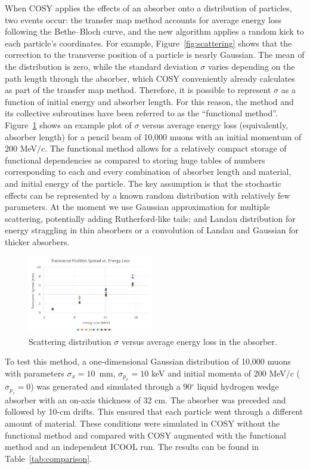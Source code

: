 \documentclass{jacow}
\begin{document}
When COSY applies the effects of an absorber onto a distribution of particles, two events occur: the transfer map method accounts for average energy loss following the Bethe--Bloch curve, and the new algorithm applies a random kick to each particle's coordinates. For example, Figure~\ref{fig:scattering} shows that the correction to the transverse position of a particle is nearly Gaussian. The mean of the distribution is zero, while the standard deviation $\sigma$ varies depending on the path length through the absorber, which COSY conveniently already calculates as part of the transfer map method. Therefore, it is possible to represent $\sigma$ as a function of initial energy and absorber length. For this reason, the method and its collective subroutines have been referred to as the ``functional method''. Figure~\ref{fig:functional} shows an example plot of $\sigma$ versus average energy loss (equivalently, absorber length) for a pencil beam of 10,000 muons with an initial momentum of 200 MeV$/c$. The functional method allows for a relatively compact storage of functional dependencies as compared to storing huge tables of numbers corresponding to each and every combination of absorber length and material, and initial energy of the particle. The key assumption is that the stochastic effects can be represented by a known random distribution with relatively few parameters. At the moment we use Gaussian approximation for multiple scattering, potentially adding Rutherford-like tails; and Landau distribution for energy straggling in thin absorbers or a convolution of Landau and Gaussian for thicker absorbers.

\begin{figure}[htf]
\centering
\includegraphics[width=0.49\textwidth]{figures/functional.jpg}
\caption{Scattering distribution $\sigma$ versus average energy loss in the absorber.}
\label{fig:functional}
\end{figure}

To test this method, a one-dimensional Gaussian distribution of 10,000 muons with parameters $\sigma_x=10$~mm, $\sigma_{p_x}=10$ keV and initial momenta of 200 MeV$/c$ ($\sigma_{p_z} = 0$) was generated and simulated through a 90$^\circ$ liquid hydrogen wedge absorber with an on-axis thickness of 32 cm. The absorber was preceded and followed by 10-cm drifts. This ensured that each particle went through a different amount of material. These conditions were simulated in COSY without the functional method and compared with COSY augmented with the functional method and an independent ICOOL run. The results can be found in Table~\ref{tab:comparison}.
\end{document}

